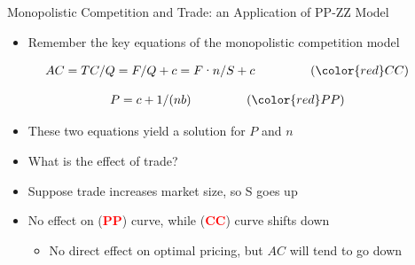 \documentclass[10pt,hyperref={CJKbookmarks=true},xcolor=dvipsnames,aspectratio=169]{beamer}
\begin{document}
\begin{frame}{Monopolistic Competition and Trade: an Application of PP-ZZ Model}

\begin{itemize}
\item Remember the key equations of the monopolistic competition model 
\end{itemize}
\[
AC=TC/Q=F/Q+c=F\text{·}n/S+c\begin{array}{ccccc}
 &  &  &  & ({\color{red}CC})\end{array}
\]


\[
P=c+1/(nb)\begin{array}{ccccc}
 &  &  &  & ({\color{red}PP})\end{array}
\]

\begin{itemize}
\item These two equations yield a solution for $P$ and $n$ 
\item What is the effect of trade? 
\item Suppose trade increases market size, so S goes up 
\item No effect on (\textbf{\textcolor{red}{PP}}) curve, while (\textbf{\textcolor{red}{CC}})
curve shifts down 

\begin{itemize}
\item No direct effect on optimal pricing, but $AC$ will tend to go down 
\end{itemize}
\end{itemize}
\end{frame}
\end{document}
